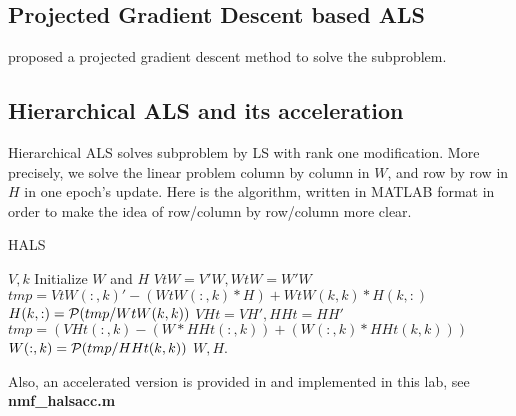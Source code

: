 \documentclass{article}
\begin{document}
\subsection{Projected Gradient Descent based ALS}
\cite{alspgd} proposed a projected gradient descent method to solve the subproblem. 
\subsection{Hierarchical ALS and its acceleration}
Hierarchical  ALS \cite{hals} solves subproblem by LS with rank one modification. More precisely, we solve the linear problem column by column in $W$, and row by row in $H$ in one epoch's update. Here is  the algorithm, written in MATLAB format in order to make the idea of row/column by row/column more clear.

\begin{algorithm}[H]
	\caption{HALS}
	\begin{algorithmic}[1]
		\REQUIRE $V, k$
		\STATE Initialize $W$ and $H$ 
		\STATE $VtW = V'W, WtW = W'W$
		\STATE $tmp = VtW(:,k)' - (WtW(:,k) * H) + WtW(k,k)*H(k,:)$
		\STATE $H(k,:) = \P(tmp/WtW(k,k))$
		\ENDFOR
				\STATE $VHt = VH', HHt = HH'$
		\STATE $tmp = (VHt(:,k) - (W * HHt(:,k)) + (W(:,k)* HHt(k,k)))$
		\STATE $W(:,k) = \P(tmp/HHt(k,k))$
		\ENDFOR
		\ENDWHILE
		\STATE \Return $W,H$.
	\end{algorithmic}
\end{algorithm}

Also, an accelerated version is provided in \cite{muacc} and implemented in this lab, see \textbf{nmf\_halsacc.m}
\iffalse
\section{Methods based on ANLS}

\subsection{Block Pivoting}

\subsection{Active Set}

\subsection{Grouped Active Set}
\fi
\end{document}

